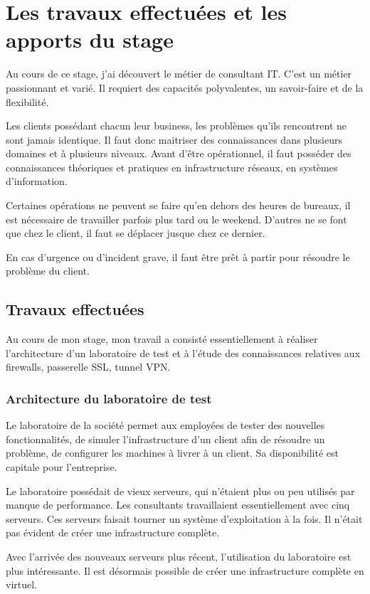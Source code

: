 \chapter{Les travaux effectuées et les apports du stage}
Au cours de ce stage, j'ai découvert le métier de consultant IT.
C'est un métier passionnant et varié.
Il requiert des capacités polyvalentes, un savoir-faire et de la flexibilité.

Les clients possédant chacun leur business, les problèmes qu'ils rencontrent ne sont jamais identique.
Il faut donc maitriser des connaissances dans plusieurs domaines et à plusieurs niveaux.
Avant d'être opérationnel, il faut posséder des connaissances théoriques et pratiques en infrastructure réseaux, en systèmes d'information.

Certaines opérations ne peuvent se faire qu'en dehors des heures de bureaux, il est nécessaire de travailler parfois plus tard ou le weekend. 
D'autres ne se font que chez le client, il faut se déplacer jusque chez ce dernier.

En cas d'urgence ou d'incident grave, il faut être prêt à partir pour résoudre le problème du client. 

\section{Travaux effectuées}
Au cours de mon stage, mon travail a consisté essentiellement à réaliser l'architecture d'un laboratoire de test et à l'étude des connaissances relatives aux firewalls, passerelle SSL, tunnel VPN.

\subsection{Architecture du laboratoire de test}
Le laboratoire de la société permet aux employées de tester des nouvelles fonctionnalités, de simuler l'infrastructure d'un client afin de résoudre un problème, de configurer les machines à livrer à un client.
Sa disponibilité est capitale pour l'entreprise.

Le laboratoire possédait de vieux serveurs, qui n'étaient plus ou peu utilisés par manque de performance.
Les consultants travaillaient essentiellement avec cinq serveurs.
Ces serveurs faisait tourner un système d'exploitation à la fois.
Il n'était pas évident de créer une infrastructure complète.

Avec l'arrivée des nouveaux serveurs plus récent, l'utilisation du laboratoire est plus intéressante.
Il est désormais possible de créer une infrastructure complète en virtuel.

